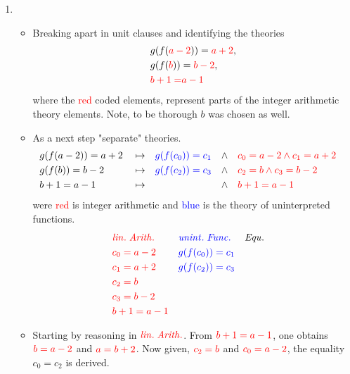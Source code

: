 \documentclass[11pt,a4paper]{article}
\begin{document}
\begin{enumerate}
\item
\begin{itemize}
\item Breaking apart in unit clauses and identifying the theories
\begin{equation*}
\begin{split}
& g(f (\textcolor{red}{a - 2})) = \textcolor{red}{a + 2}, \\
& g(f (\textcolor{red}{b})) = \textcolor{red}{b - 2}, \\
& \textcolor{red}{b + 1 =} \textcolor{red}{a - 1}
\end{split}
\end{equation*}
where the \textcolor{red}{red} coded elements, represent parts of the integer arithmetic theory elements. Note, to be thorough $b$ was chosen as well. 
\item As a next step "separate" theories.
\begin{align*}
&g(f (a - 2)) = a + 2 && \mapsto && \textcolor{blue}{g(f (c_0)) = c_1} && \land  && \textcolor{red}{c_0 = a - 2 \land c_1 = a +2} & \\
&g(f (b)) = b - 2 && \mapsto && \textcolor{blue}{g(f (c_2)) = c_3} && \land  && \textcolor{red}{c_2 = b \land c_3 =b-2} & \\
&b + 1 = a - 1 && \mapsto &&  && \land  && \textcolor{red}{b + 1 = a - 1} & \\
\end{align*}
were \textcolor{red}{red} is integer arithmetic and \textcolor{blue}{blue} is the theory of uninterpreted functions.
\begin{align*}
& \textcolor{red}{ \mathit{lin. \; Arith.} }  && \textcolor{blue}{ \mathit{unint. \; Func.}} &&  \mathit{Equ.}  &\\
& \textcolor{red}{ c_0 = a - 2 }  && \textcolor{blue}{ g(f (c_0)) = c_1 } &&    &\\
& \textcolor{red}{ c_1 = a + 2 }  && \textcolor{blue}{ g(f (c_2)) = c_3 } &&    &\\
& \textcolor{red}{ c_2 = b  }  && \textcolor{blue}{ } &&    &\\
& \textcolor{red}{ c_3 = b-2 }  && \textcolor{blue}{ } &&    &\\
& \textcolor{red}{ b + 1 = a - 1 }  && \textcolor{blue}{ } &&    &\\
\end{align*}
\item Starting by reasoning in $\textcolor{red}{ \mathit{lin. \; Arith.} }$. From $\textcolor{red}{b+1 = a-1}$, one obtains $\textcolor{red}{b = a-2}$ and $\textcolor{red}{a = b+2}$. Now given, $\textcolor{red}{c_2 = b}$ and $\textcolor{red}{c_0 = a-2}$, the equality $c_0 = c_2$ is derived.

\end{itemize}
\end{enumerate}
\end{document}
